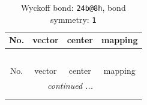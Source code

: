 \documentclass[fleqn,8pt]{jsarticle}
\begin{document}
\renewcommand{\arraystretch}{1.2}
\begin{longtable}{cccc}
\caption{Wyckoff bond: {\tt 24b@8h}, bond symmetry: {\tt 1}}
 \\
 \hline \hline
No. & vector & center & mapping \\ \hline \endfirsthead

\multicolumn{3}{l}{\tablename\ \thetable{}} \\
 \hline \hline
No. & vector & center & mapping \\ \hline \endhead

 \hline \hline
\multicolumn{3}{r}{\footnotesize\it continued ...} \\ \endfoot

 \hline \hline
\multicolumn{3}{r}{} \\ \endlastfoot


\end{longtable}
\end{document}
